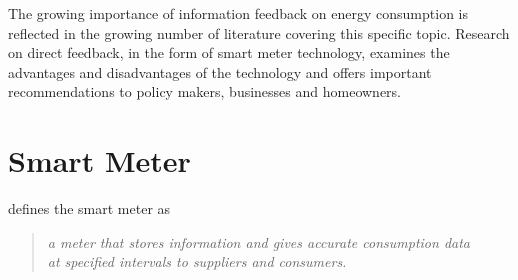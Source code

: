 %
%

% 

The growing importance of information feedback on energy consumption is reflected in the growing number of literature covering this specific topic. Research on direct feedback, in the form of smart meter technology, examines the advantages and disadvantages of the technology and offers important recommendations to policy makers, businesses and homeowners.

\section{Smart Meter}
\label{ch:Content1:sec:Smart Meter}
\citep{Darby2008} defines the smart meter as 
\begin{quotation}
\textit{a meter that stores information and gives accurate consumption data\\ 
at specified intervals to suppliers and consumers.}
\end{quotation}

